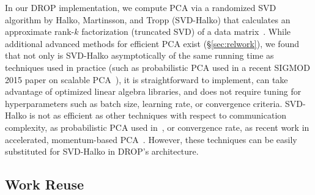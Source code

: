 In our DROP implementation, we compute PCA via a randomized SVD algorithm by Halko, Martinsson, and Tropp (SVD-Halko) that calculates an approximate rank-$k$ factorization (truncated SVD) of a data matrix~\cite{tropp}. 
While additional advanced methods for efficient PCA exist (\S\ref{sec:relwork}), we found that not only is SVD-Halko asymptotically of the same running time as techniques used in practice (such as probabilistic PCA used in a recent SIGMOD 2015 paper on scalable PCA~\cite{ppca-sigmod}), it is straightforward to implement, can take advantage of optimized linear algebra libraries, and does not require tuning for hyperparameters such as batch size, learning rate, or convergence criteria.  
SVD-Halko is not as efficient as other techniques with respect to communication complexity, as probabilistic PCA used in~\cite{ppca-sigmod}, or convergence rate, as recent work in accelerated, momentum-based PCA~\cite{re-new}.
However, these techniques can be easily substituted for SVD-Halko in DROP's architecture.

\subsection{Work Reuse}
\label{subsec:reuse}

